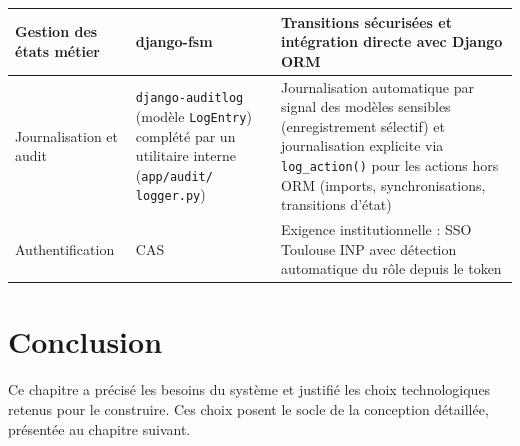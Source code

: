 \begin{longtable}{|p{3cm}|p{3.5cm}|p{8.5cm}|}
Gestion des états métier & django-fsm & Transitions sécurisées et intégration directe avec Django ORM \\
\hline

Journalisation et audit & \texttt{django-auditlog} (modèle \texttt{LogEntry}) complété par un utilitaire interne (\texttt{app/audit/ logger.py}) & Journalisation automatique par signal des modèles sensibles (enregistrement sélectif) et journalisation explicite via \texttt{log\_action()} pour les actions hors ORM (imports, synchronisations, transitions d'état) \\
\hline

Authentification & CAS & Exigence institutionnelle : SSO Toulouse INP avec détection automatique du rôle depuis le token \\
\hline

\end{longtable}


\section*{Conclusion}
\justifying
{}
{}

Ce chapitre a précisé les besoins du système et justifié les choix technologiques retenus pour le construire. Ces choix posent le socle de la conception détaillée, présentée au chapitre suivant.
